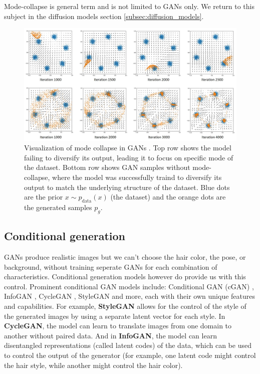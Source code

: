 Mode-collapse is general term and is not limited to GANs only. We return to this subject in the diffusion models section \ref{subsec:diffusion_models}.

\begin{figure}
    \centering
    \includegraphics[width=\textwidth]{images/gan/gan_mode_collapse.png}
    \caption{Visualization of mode collapse in GANs \cite{gan_mode_collapse_image_source}. Top row shows the model failing to diversify its output, leading it to focus on specific mode of the dataset. Bottom row shows GAN samples without mode-collapse, where the model was successfully traind to diversify its output to match the underlying structure of the dataset. Blue dots are the prior $x \sim p_{\text{data}}(x)$ (the dataset) and the orange dots are the generated samples $p_g$.}
    \label{fig:gan_mode_collapse}
\end{figure}




\subsection{Conditional generation}
\label{subsec:gan_conditional_generation}

GANs produce realistic images but we can't choose the hair color, the pose, or background, without training seperate GANs for each combination of characteristics. Conditional generation models however do provide us with this control. Prominent conditional GAN models include: Conditional GAN (cGAN) \cite{cgan}, InfoGAN \cite{infogan}, CycleGAN \cite{cyclegan}, StyleGAN \cite{stylegan} and more, each with their own unique features and capabilities. For example, \textbf{StyleGAN} allows for the control of the style of the generated images by using a separate latent vector for each style. In \textbf{CycleGAN}, the model can learn to translate images from one domain to another without paired data. And in \textbf{InfoGAN}, the model can learn disentangled representations (called latent codes) of the data, which can be used to control the output of the generator (for example, one latent code might control the hair style, while another might control the hair color).

